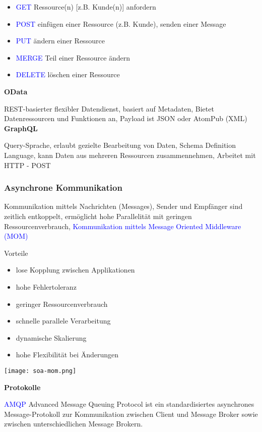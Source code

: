 \begin{itemize}
    \item \textcolor{blue}{GET} Ressource(n) [z.B. Kunde(n)] anfordern
    \item \textcolor{blue}{POST} einfügen einer Ressource (z.B. Kunde), senden einer Message
    \item \textcolor{blue}{PUT} ändern einer Ressource
    \item \textcolor{blue}{MERGE} Teil einer Ressource ändern
    \item \textcolor{blue}{DELETE} löschen einer Ressource
\end{itemize}
\vspace{10pt}
\textbf{OData}

REST-basierter flexibler Datendienst, basiert auf Metadaten, Bietet Datenressourcen und Funktionen an, Payload ist JSON oder AtomPub (XML) \\

\textbf{GraphQL}

Query-Sprache, erlaubt gezielte Bearbeitung von Daten, Schema Definition Language, kann Daten aus mehreren Ressourcen zusammennehmen, Arbeitet mit HTTP - POST


\subsubsection{Asynchrone Kommunikation}

Kommunikation mittels Nachrichten (Messages), Sender und Empfänger sind zeitlich entkoppelt, ermöglicht hohe Parallelität mit geringen Ressourcenverbrauch, \textcolor{blue}{Kommunikation mittels Message Oriented Middleware (MOM)}

Vorteile

\begin{itemize}
    \item lose Kopplung zwischen Applikationen
    \item hohe Fehlertoleranz
    \item geringer Ressourcenverbrauch
    \item schnelle parallele Verarbeitung
    \item dynamische Skalierung
    \item hohe Flexibilität bei Änderungen
\end{itemize}

\texttt{[image: soa-mom.png]}

\textbf{Protokolle}

\textcolor{blue}{AMQP} Advanced Message Queuing Protocol ist ein standardisiertes asynchrones Message-Protokoll zur Kommunikation zwischen Client und Message Broker sowie zwischen unterschiedlichen Message Brokern.

